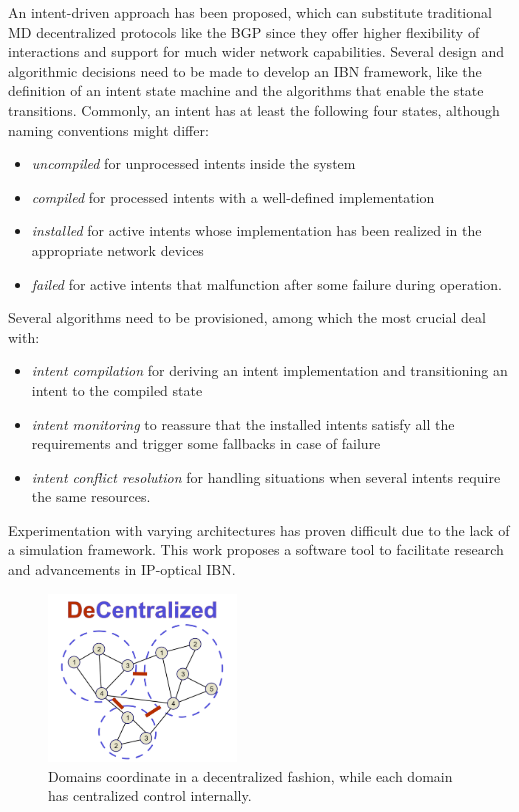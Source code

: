 \documentclass{juliacon}
\begin{document}
    An intent-driven approach \cite{2023ietf, 2022ChristouCNSM} has been proposed, which can substitute traditional \ac{MD} decentralized protocols like the \ac{BGP} since they offer higher flexibility of interactions and support for much wider network capabilities.
    Several design and algorithmic decisions need to be made to develop an \ac{IBN} framework, like the definition of an intent state machine and the algorithms that enable the state transitions.
    Commonly, an intent has at least the following four states, although naming conventions might differ:
    \begin{itemize}
        \item \emph{uncompiled} for unprocessed intents inside the system
        \item \emph{compiled} for processed intents with a well-defined implementation
        \item \emph{installed} for active intents whose implementation has been realized in the appropriate network devices
        \item \emph{failed} for active intents that malfunction after some failure during operation.
    \end{itemize}
    Several algorithms need to be provisioned, among which the most crucial deal with:
    \begin{itemize}
        \item \emph{intent compilation} for deriving an intent implementation and transitioning an intent to the compiled state
        \item \emph{intent monitoring} to reassure that the installed intents satisfy all the requirements and trigger some fallbacks in case of failure
        \item \emph{intent conflict resolution} for handling situations when several intents require the same resources.
    \end{itemize}
    Experimentation with varying architectures has proven difficult due to the lack of a simulation framework. 
    This work proposes a software tool to facilitate research and advancements in IP-optical \ac{IBN}.


    \begin{figure}[t]
    \centerline{\includegraphics[width=5cm]{Motive.pdf}}
    \caption{Domains coordinate in a decentralized fashion, while each domain has centralized control internally.}
        \label{fig:DeCentralized}
    \end{figure}
\end{document}
